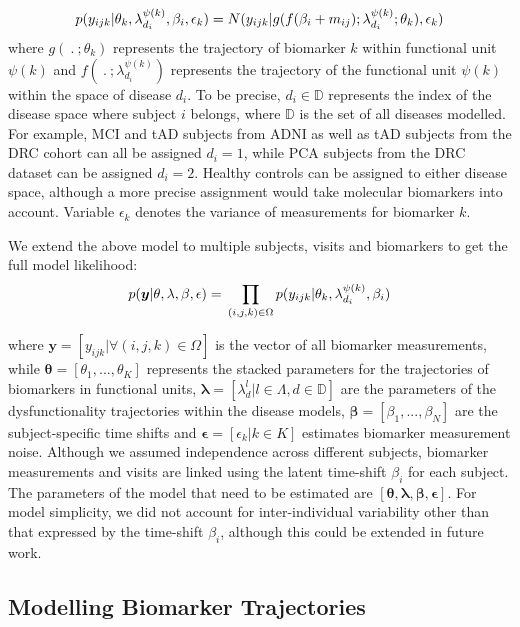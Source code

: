 \begin{equation}
 p(y_{ijk}|\theta_k, \lambda_{d_i}^{\psi(k)}, \beta_i, \epsilon_k) = N(y_{ijk}| g(f(\beta_i + m_{ij}); \lambda_{d_i}^{\psi(k)}; \theta_k), \epsilon_k)
\end{equation}
where $g(\ .\ ; \theta_k)$ represents the trajectory of biomarker $k$ within functional unit $\psi(k)$ and $f(\ .\ ; \lambda_{d_i}^{\psi(k)})$ represents the trajectory of the functional unit $\psi(k)$ within the space of disease $d_i$. To be precise, $d_i \in \mathbb{D}$ represents the index of the disease space where subject $i$ belongs, where $\mathbb{D}$ is the set of all diseases modelled. For example, MCI and tAD subjects from ADNI as well as tAD subjects from the DRC cohort can all be assigned $d_i=1$, while PCA subjects from the DRC dataset can be assigned $d_i=2$. Healthy controls can be assigned to either disease space, although a more precise assignment would take molecular biomarkers into account. Variable $\epsilon_k$ denotes the variance of measurements for biomarker $k$. 

We extend the above model to multiple subjects, visits and biomarkers to get the full model likelihood:
\begin{equation}
 p(\boldsymbol{y}|\theta, \lambda, \beta , \epsilon) = \\ \prod_{(i,j,k) \in \Omega} p(y_{ijk}|\theta_k, \lambda_{d_i}^{\psi(k)}, \beta_i) 
\end{equation}

where $\boldsymbol{y} = [y_{ijk} | \forall (i,j,k) \in \Omega ]$ is the vector of all biomarker measurements, while $\boldsymbol{\theta} = [\theta_1, ..., \theta_K]$ represents the stacked parameters for the trajectories of biomarkers in functional units, $\boldsymbol{\lambda} = [\lambda_d^{l}|l \in \Lambda, d \in \mathbb{D}]$ are the parameters of the dysfunctionality trajectories within the disease models, $\boldsymbol{\beta} =[\beta_1, ..., \beta_N]$ are the subject-specific time shifts and $\boldsymbol{\epsilon} = [\epsilon_k | k \in K]$  estimates biomarker measurement noise. Although we assumed independence across different subjects, biomarker measurements and visits are linked using the latent time-shift $\beta_i$ for each subject. The parameters of the model that need to be estimated are $[\boldsymbol{\theta}, \boldsymbol{\lambda}, \boldsymbol{\beta}, \boldsymbol{\epsilon}]$. For model simplicity, we did not account for inter-individual variability other than that expressed by the time-shift $\beta_i$, although this could be extended in future work.

\subsection{Modelling Biomarker Trajectories}
\label{sec:dktBiomkTraj}

